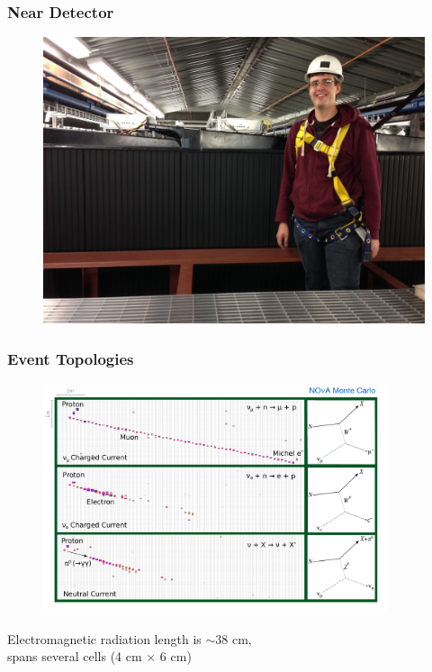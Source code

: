 \documentclass[10pt,professionalfonts,xcolor=table]{beamer}
\begin{document}
\frame
{
  \frametitle{Near Detector}
	\begin{figure} \includegraphics[height=0.55\textwidth]{figures/det_photos/meND_small.jpg} \end{figure}
}

\frame
{
  \frametitle{Event Topologies}

 \begin{figure} \includegraphics[width=0.9\textwidth]{figures/figures/event_topology_nue.pdf} \end{figure}
  \vspace{-15pt}
 \begin{center}
 \footnotesize Electromagnetic radiation length is $\sim$38 cm, \\
 spans several cells (4 cm $\times$ 6 cm)
 \end{center}

}
\end{document}
